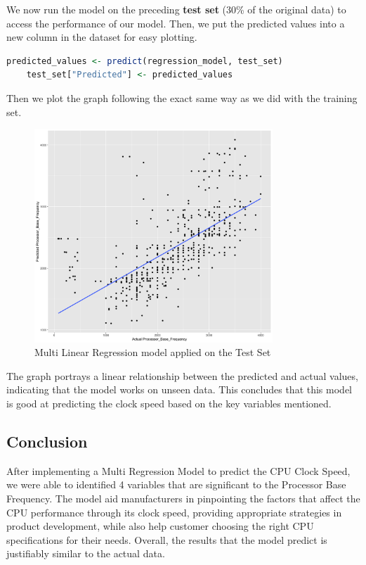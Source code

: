 We now run the model on the preceding \textbf{test set} (30\% of the original data) to access the performance of our model. Then, we put the predicted values into a new column in the dataset for easy plotting.\\

\begin{lstlisting}[language=R]
    predicted_values <- predict(regression_model, test_set)
    test_set["Predicted"] <- predicted_values
\end{lstlisting}

Then we plot the graph following the exact same way as we did with the training set.\\

\begin{figure}[H]
    \centering
    \includegraphics[width=0.8\textwidth]{graphics/test_set_new.png}
    \caption{Multi Linear Regression model applied on the Test Set}
\end{figure}

The graph portrays a linear relationship between the predicted and actual values, indicating that the model works on unseen data. This concludes that this model is good at predicting the clock speed based on the key variables mentioned.

\subsection{Conclusion}
After implementing a Multi Regression Model to predict the CPU Clock Speed, we were able to identified 4 variables that are significant to the Processor Base Frequency. The model aid manufacturers in pinpointing the factors that affect the CPU performance through its clock speed, providing appropriate strategies in product development, while also help customer choosing the right CPU specifications for their needs. Overall, the results that the model predict is justifiably similar to the actual data. 
\newpage
